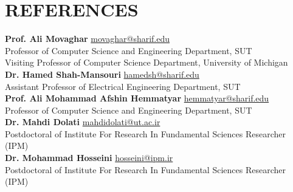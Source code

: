 \documentclass[11pt]{article}
\begin{document}
\section{REFERENCES}

\textbf{Prof. Ali Movaghar} \href{https://scholar.google.com/citations?user=BXNelwwAAAAJ\&hl=en}{\small \faExternalLink} \hfill \href{mailto:movaghar@sharif.edu}{movaghar@sharif.edu}\\
Professor of Computer Science and Engineering Department, SUT \\
Visiting Professor of Computer Science Department, University of Michigan\\
\textbf{Dr. Hamed Shah-Mansouri} \href{https://scholar.google.com/citations?user=dcjIFccAAAAJ&hl=en&oi=ao}{\small \faExternalLink} \hfill  \href{mailto:hamedsh@sharif.edu}{hamedsh@sharif.edu}\\
Assistant Professor of Electrical Engineering Department, SUT\\
\textbf{Prof. Ali Mohammad Afshin Hemmatyar} \href{https://scholar.google.com/citations?user=wob0AskAAAAJ&hl=en&oi=ao}{\small \faExternalLink}  \hfill \href{mailto:hemmatyar@sharif.edu}{hemmatyar@sharif.edu}\\
Professor of Computer Science and Engineering Department, SUT\\
\textbf{Dr. Mahdi Dolati} \href{https://scholar.google.com/citations?user=b7A2CXYAAAAJ&hl=en&oi=ao}{\small \faExternalLink} \hfill  \href{mailto:mahdidolati@ut.ac.ir}{mahdidolati@ut.ac.ir}\\ Postdoctoral of Institute For Research In Fundamental Sciences Researcher (IPM)\\
\textbf{Dr. Mohammad Hosseini} \href{https://scholar.google.com/citations?user=iRO-DVoAAAAJ&hl=en&oi=ao}{\small \faExternalLink} \hfill  \href{mailto:hosseini@ipm.ir}{hosseini@ipm.ir} \\ Postdoctoral of Institute For Research In Fundamental Sciences Researcher (IPM)

\end{document}
